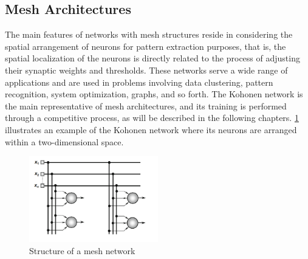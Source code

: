\subsection{Mesh Architectures}
The main features of networks with mesh structures reside in considering the spatial
arrangement of neurons for pattern extraction purposes, that is, the spatial localization
of the neurons is directly related to the process of adjusting their synaptic
weights and thresholds. These networks serve a wide range of applications and are
used in problems involving data clustering, pattern recognition, system optimization,
graphs, and so forth.
The Kohonen network is the main representative of mesh architectures, and its
training is performed through a competitive process, as will be described in the
following chapters. \ref{fig:ann4} illustrates an example of the Kohonen network
where its neurons are arranged within a two-dimensional space.
\begin{figure}[H]
\centering
\includegraphics[width=0.5\textwidth]{img/ann4.PNG}
\caption{ Structure of a mesh network }
\label{fig:ann4}
\end{figure}


